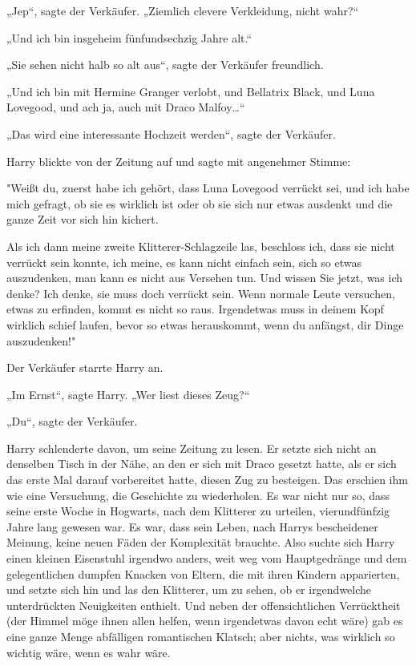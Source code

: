 {„Jep“, sagte der Verkäufer. „Ziemlich clevere Verkleidung, nicht wahr?“

„Und ich bin insgeheim fünfundsechzig Jahre alt.“

„Sie sehen nicht halb so alt aus“, sagte der Verkäufer freundlich.

„Und ich bin mit Hermine Granger verlobt, und Bellatrix Black, und Luna Lovegood, und ach ja, auch mit Draco Malfoy…“

„Das wird eine interessante Hochzeit werden“, sagte der Verkäufer.

Harry blickte von der Zeitung auf und sagte mit angenehmer Stimme:

"Weißt du, zuerst habe ich gehört, dass Luna Lovegood verrückt sei, und ich habe mich gefragt, ob sie es wirklich ist oder ob sie sich nur etwas ausdenkt und die ganze Zeit vor sich hin kichert.

Als ich dann meine zweite Klitterer-Schlagzeile las, beschloss ich, dass sie nicht verrückt sein konnte, ich meine, es kann nicht einfach sein, sich so etwas auszudenken, man kann es nicht aus Versehen tun. Und wissen Sie jetzt, was ich denke? Ich denke, sie muss doch verrückt sein. Wenn normale Leute versuchen, etwas zu erfinden, kommt es nicht so raus. Irgendetwas muss in deinem Kopf wirklich schief laufen, bevor so etwas herauskommt, wenn du anfängst, dir Dinge auszudenken!"

Der Verkäufer starrte Harry an.

„Im Ernst“, sagte Harry. „Wer liest dieses Zeug?“

„Du“, sagte der Verkäufer.

Harry schlenderte davon, um seine Zeitung zu lesen. Er setzte sich nicht an denselben Tisch in der Nähe, an den er sich mit Draco gesetzt hatte, als er sich das erste Mal darauf vorbereitet hatte, diesen Zug zu besteigen. Das erschien ihm wie eine Versuchung, die Geschichte zu wiederholen. Es war nicht nur so, dass seine erste Woche in Hogwarts, nach dem Klitterer zu urteilen, vierundfünfzig Jahre lang gewesen war. Es war, dass sein Leben, nach Harrys bescheidener Meinung, keine neuen Fäden der Komplexität brauchte. Also suchte sich Harry einen kleinen Eisenstuhl irgendwo anders, weit weg vom Hauptgedränge und dem gelegentlichen dumpfen Knacken von Eltern, die mit ihren Kindern apparierten, und setzte sich hin und las den Klitterer, um zu sehen, ob er irgendwelche unterdrückten Neuigkeiten enthielt. Und neben der offensichtlichen Verrücktheit (der Himmel möge ihnen allen helfen, wenn irgendetwas davon echt wäre) gab es eine ganze Menge abfälligen romantischen Klatsch; aber nichts, was wirklich so wichtig wäre, wenn es wahr wäre.

}
